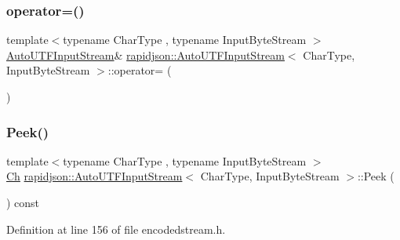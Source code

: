 \subsubsection{\texorpdfstring{operator=()}{operator=()}}
{\footnotesize\ttfamily template$<$typename Char\+Type , typename Input\+Byte\+Stream $>$ \\
\mbox{\hyperlink{classrapidjson_1_1_auto_u_t_f_input_stream}{Auto\+U\+T\+F\+Input\+Stream}}\& \mbox{\hyperlink{classrapidjson_1_1_auto_u_t_f_input_stream}{rapidjson\+::\+Auto\+U\+T\+F\+Input\+Stream}}$<$ Char\+Type, Input\+Byte\+Stream $>$\+::operator= (\begin{DoxyParamCaption}\item[{const \mbox{\hyperlink{classrapidjson_1_1_auto_u_t_f_input_stream}{Auto\+U\+T\+F\+Input\+Stream}}$<$ Char\+Type, Input\+Byte\+Stream $>$ \&}]{ }\end{DoxyParamCaption})\hspace{0.3cm}{\ttfamily [private]}}

\mbox{\label{classrapidjson_1_1_auto_u_t_f_input_stream_a6c5f36399d52fdc8230c25e092d4c357}} 
\subsubsection{\texorpdfstring{Peek()}{Peek()}}
{\footnotesize\ttfamily template$<$typename Char\+Type , typename Input\+Byte\+Stream $>$ \\
\mbox{\hyperlink{classrapidjson_1_1_auto_u_t_f_input_stream_a6d9eca095f7ef8c249ebe43568d66d0e}{Ch}} \mbox{\hyperlink{classrapidjson_1_1_auto_u_t_f_input_stream}{rapidjson\+::\+Auto\+U\+T\+F\+Input\+Stream}}$<$ Char\+Type, Input\+Byte\+Stream $>$\+::Peek (\begin{DoxyParamCaption}{ }\end{DoxyParamCaption}) const}



Definition at line 156 of file encodedstream.\+h.


\begin{DoxyCode}{0}

\end{DoxyCode}
\mbox{\label{classrapidjson_1_1_auto_u_t_f_input_stream_a407d1e2e7db6a547833e6b0a44162b6e}} 
